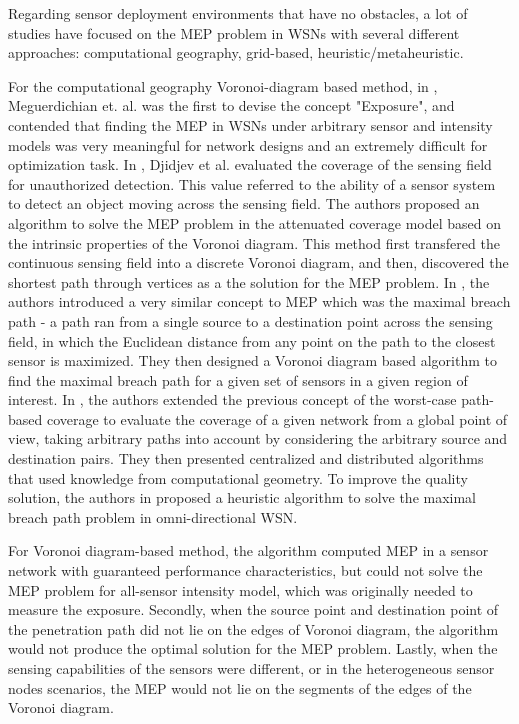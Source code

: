 \documentclass[final]{elsarticle}
\begin{document}
Regarding sensor deployment environments that have no obstacles, a lot of studies have focused on the MEP problem in WSNs with several different approaches: computational geography, grid-based, heuristic/metaheuristic.

For the computational geography Voronoi-diagram based method, in \cite{meguerdichian2001exposure}, Meguerdichian et. al. was the first to devise the concept "Exposure", and contended that finding the MEP in WSNs under arbitrary sensor and intensity models was very meaningful for network designs and an extremely difficult for optimization task. In \cite{djidjev2010approximation}, Djidjev et al. evaluated the coverage of the sensing field for unauthorized detection. This value referred to the ability of a sensor system to detect an object moving across the sensing field. The authors proposed an algorithm to solve the MEP problem in the attenuated coverage model based on the intrinsic properties of the Voronoi diagram. This method first transfered the continuous sensing field into a discrete Voronoi diagram, and then, discovered the shortest path through vertices as a the solution for the MEP problem. In \cite{megerian2005worst}, the authors introduced a very similar concept to MEP which was the maximal breach path - a path ran from a single source to a destination point across the sensing field, in which the Euclidean distance from any point on the path to the closest sensor is maximized. They then designed a Voronoi diagram based algorithm to find the maximal breach path for a given set of sensors in a given region of interest. In \cite{lee2013best}, the authors  extended the previous concept of the worst-case path-based coverage to evaluate the coverage of a given network from a global point of view, taking arbitrary paths into account by considering the arbitrary source and destination pairs. They then presented centralized and distributed algorithms that used knowledge from computational geometry. To improve the quality solution, the authors in \cite{binh2016heuristic} proposed a heuristic algorithm to solve the maximal breach path problem in omni-directional WSN.

For Voronoi diagram-based method, the algorithm computed MEP in a sensor network with guaranteed performance characteristics, but could not solve the MEP problem for all-sensor intensity model, which was originally needed to measure the exposure. Secondly, when the source point and destination point of the penetration
path did not lie on the edges of Voronoi diagram, the algorithm would not produce the optimal solution for the MEP problem. Lastly, when the sensing capabilities of the sensors were different, or in the heterogeneous sensor nodes scenarios, the MEP would not lie on the segments of the edges of the Voronoi diagram.
\end{document}

